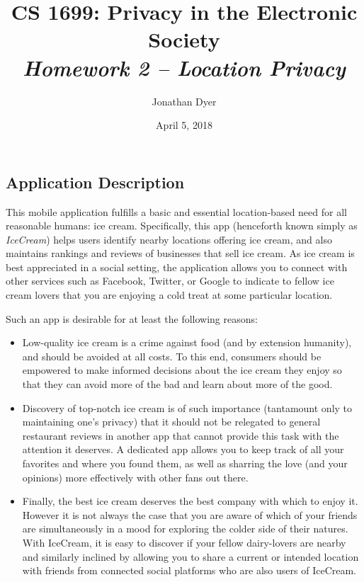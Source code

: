 \documentclass{article}
\author{Jonathan Dyer}
\date{April 5, 2018}
\title{CS 1699: Privacy in the Electronic Society \\
        \textit{Homework 2 -- Location Privacy}}
\providecommand{\tightlist}{
    \setlength{\itemsep}{0pt}\setlength{\parskip}{0pt}
}
\begin{document}
\maketitle

\subsection{Application Description}
This mobile application fulfills a basic and essential location-based need for all reasonable humans: ice cream.
Specifically, this app (henceforth known simply as \textit{IceCream}) helps users identify nearby locations offering ice cream, and also maintains rankings and reviews of businesses that sell ice cream.
As ice cream is best appreciated in a social setting, the application allows you to connect with other services such as Facebook, Twitter, or Google to indicate to fellow ice cream lovers that you are enjoying a cold treat at some particular location. \par
Such an app is desirable for at least the following reasons:
\begin{itemize}\tightlist
  \item Low-quality ice cream is a crime against food (and by extension humanity), and should be avoided at all costs. To this end, consumers should be empowered to make informed decisions about the ice cream they enjoy so that they can avoid more of the bad and learn about more of the good.
  \item Discovery of top-notch ice cream is of such importance (tantamount only to maintaining one's privacy) that it should not be relegated to general restaurant reviews in another app that cannot provide this task with the attention it deserves. A dedicated app allows you to keep track of all your favorites and where you found them, as well as sharring the love (and your opinions) more effectively with other fans out there.
  \item Finally, the best ice cream deserves the best company with which to enjoy it. However it is not always the case that you are aware of which of your friends are simultaneously in a mood for exploring the colder side of their natures. With IceCream, it is easy to discover if your fellow dairy-lovers are nearby and similarly inclined by allowing you to share a current or intended location with friends from connected social platforms who are also users of IceCream.
\end{itemize}
\end{document}
